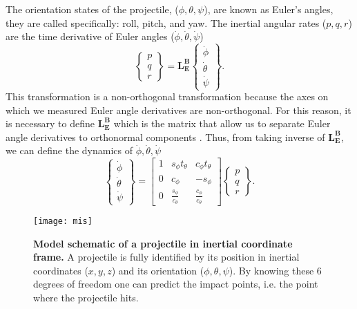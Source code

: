 \documentclass[letterpaper, 10 pt, conference]{ieeeconf}  %
\begin{document}
The orientation states of the projectile, ($\phi, \theta, \psi$), are known as Euler's angles, they are called specifically: roll, pitch, and yaw. The inertial angular rates ($p, q, r$) are the time derivative of Euler angles ($\dot{\phi}, \dot{\theta},\dot{\psi}$) 
\begin{equation}
\begin{Bmatrix}
p\\q\\r
\end{Bmatrix}=\boldsymbol{L_E^B}
\begin{Bmatrix}
\dot{\phi} \\ \dot{\theta} \\ \dot{\psi}
\end{Bmatrix}.
\label{eqn:ortn}
\end{equation}
This transformation is a non-orthogonal transformation because the axes on which we measured Euler angle derivatives are non-orthogonal. For this reason, it is necessary to define $\boldsymbol{L_E^B}$ which is the matrix that allow us to separate Euler angle derivatives to orthonormal  components \cite{stengel2015flight}. Thus, from taking inverse of $\boldsymbol{L_E^B}$, we can define the dynamics of $\dot{\phi}, \dot{\theta},\dot{\psi}$ 
\begin{equation}
\begin{Bmatrix}
\dot{\phi} \\ \dot{\theta} \\ \dot{\psi}
\end{Bmatrix}
=
\begin{bmatrix}
1& s_{\phi} t_{\theta} & c_{\phi} t_{\theta} \\
0& c_{\phi} & -s_{\phi} \\
0& \frac{s_{\phi}}{c_{\theta}} &\frac{c_{\phi}}{c_{\theta}}
\end{bmatrix}
\begin{Bmatrix}
p\\q\\r
\end{Bmatrix}.
\label{eqn:n2}
\end{equation}


\begin{figure}[!b]
\centering
\texttt{[image: mis]}
\caption{\textbf{Model schematic of a projectile in inertial coordinate frame.} A projectile is fully identified by its position in inertial coordinates ($x, y, z$) and its orientation ($\phi, \theta, \psi$). By knowing these 6 degrees of freedom one can predict the impact points, i.e. the point where the projectile hits.}
\label{fig:6DOF}
\end{figure}
\end{document}
